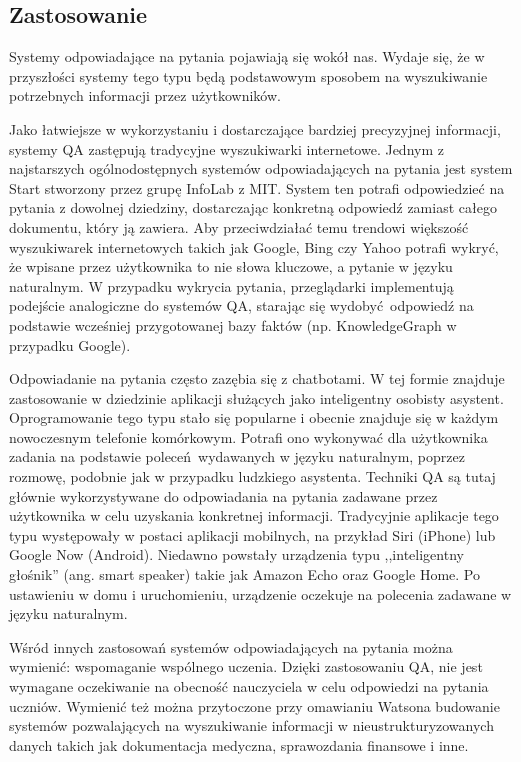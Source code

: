 \documentclass[a4paper, twoside, 12pt]{report}
\begin{document}
        \subsection{Zastosowanie}
            Systemy odpowiadające na pytania pojawiają się wokół nas. Wydaje się, że w przyszłości systemy tego typu będą
            podstawowym sposobem na wyszukiwanie potrzebnych informacji przez użytkowników.

            Jako łatwiejsze w wykorzystaniu i dostarczające bardziej precyzyjnej informacji, systemy QA zastępują tradycyjne
            wyszukiwarki internetowe. Jednym z najstarszych ogólnodostępnych systemów odpowiadających na pytania jest
            system Start stworzony przez grupę InfoLab z MIT. System ten potrafi odpowiedzieć na pytania z dowolnej
            dziedziny, dostarczając konkretną odpowiedź zamiast całego dokumentu, który ją zawiera.
            Aby przeciwdziałać temu trendowi  większość wyszukiwarek internetowych takich jak Google, Bing czy Yahoo
            potrafi wykryć, że wpisane przez użytkownika to nie słowa kluczowe, a pytanie w języku naturalnym.
            W przypadku wykrycia pytania, przeglądarki implementują podejście analogiczne do systemów QA, starając się
            wydobyć odpowiedź na podstawie wcześniej przygotowanej bazy faktów (np. KnowledgeGraph w przypadku Google).

            Odpowiadanie na pytania często zazębia się z chatbotami. W tej formie znajduje zastosowanie w dziedzinie
            aplikacji służących jako inteligentny
            osobisty asystent. Oprogramowanie tego typu stało się popularne i obecnie znajduje się w każdym nowoczesnym
            telefonie komórkowym. Potrafi ono wykonywać dla użytkownika zadania na podstawie poleceń wydawanych w języku
            naturalnym, poprzez rozmowę, podobnie jak w przypadku ludzkiego asystenta. Techniki QA są tutaj głównie
            wykorzystywane do odpowiadania na pytania zadawane przez użytkownika w celu uzyskania konkretnej informacji.
            Tradycyjnie aplikacje tego typu występowały w postaci aplikacji mobilnych, na przykład Siri (iPhone) lub
            Google Now (Android). Niedawno powstały urządzenia typu ,,inteligentny głośnik'' (ang. smart speaker) takie
            jak Amazon Echo oraz Google Home. Po ustawieniu w domu i uruchomieniu, urządzenie oczekuje na polecenia
            zadawane w języku naturalnym.

            Wśród innych zastosowań systemów odpowiadających na pytania można wymienić: wspomaganie wspólnego
            uczenia\cite{COLLABORATIVELEARNING}. Dzięki zastosowaniu QA, nie jest wymagane oczekiwanie na obecność nauczyciela
            w celu odpowiedzi na pytania uczniów. Wymienić też można przytoczone przy omawianiu Watsona budowanie systemów
            pozwalających na wyszukiwanie informacji w nieustrukturyzowanych danych takich jak dokumentacja medyczna,
            sprawozdania finansowe i inne.
\end{document}
